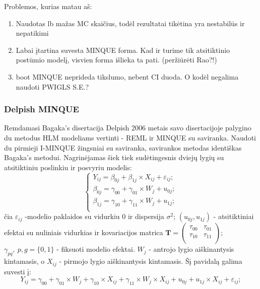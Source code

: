 \documentclass[12pt,a4paper]{article}
\begin{document}
Problemos, kurias matau aš:
\begin{enumerate}
\item Naudotas lb mažas MC skaičius, todėl rezultatai tikėtina yra nestabilūs ir nepatikimi
\item Labai įtartina suvesta MINQUE forma. Kad ir turime tik atsitiktinio postūmio modelį, visvien forma išlieka ta pati. (peržiūrėti Rao?!)
\item boot MINQUE neprideda tikslumo, nebent CI duoda. O kodėl negalima naudoti PWIGLS S.E.?
\end{enumerate}


\subsubsection{Delpish MINQUE}

\indent Remdamasi Bagaka's disertacija Delpish 2006 metais savo disertacijoje \cite{delpish} palygino du metodus HLM modeliams vertinti - REML ir MINQUE su saviranka. Naudoti du pirmieji I-MINQUE žingsniai su saviranka, savirankos metodas identiškas Bagaka's metodui. Nagrinėjamas šiek tiek sudėtingesnis dviejų lygių su atsitiktiniu poslinkiu ir posvyriu modelis:
\begin{equation} \label{eq:2lvldelpish}
\left\{
\begin{array}{l}
Y_{ij} = \beta_{0j}+ \beta_{1j}\times X_{ij}+\varepsilon_{ij}; \\
\beta_{0j} = \gamma_{00} +\gamma_{01}\times W_{j}+u_{0j};\\
\beta_{1j} = \gamma_{10} +\gamma_{11}\times W_{j}+u_{1j};\\
\end{array} \right.
\end{equation}
čia $\varepsilon_{ij}$ -modelio paklaidos su vidurkiu $0$ ir dispersija $\sigma^2$; $\left(u_{0j}, u_{1j}\right)$ - atsitiktiniai efektai su nuliniais vidurkias ir kovariacijos matrica $\mathbf{T}=\begin{pmatrix}
\tau_{00} & \tau_{01} \\
\tau_{10} & \tau_{11} \\
\end{pmatrix}$; $\gamma_{pq},\ p,g = \{0,1\}$ - fiksuoti modelio efektai. $W_j$ - antrojo lygio aiškinantysis kintamasis, o $X_{ij}$ - pirmojo lygio aiškinantysis kintamasis. Šį pavidalą galima suvesti į:
\begin{equation} \label{eq:deq}
Y_{ij} = \gamma_{00} +\gamma_{01}\times W_{j}+ \gamma_{10}\times X_{ij}+\gamma_{11}\times W_{j}\times X_{ij}+u_{0j}+u_{1j}\times X_{ij}+\varepsilon_{ij};
\end{equation}
\end{document}
